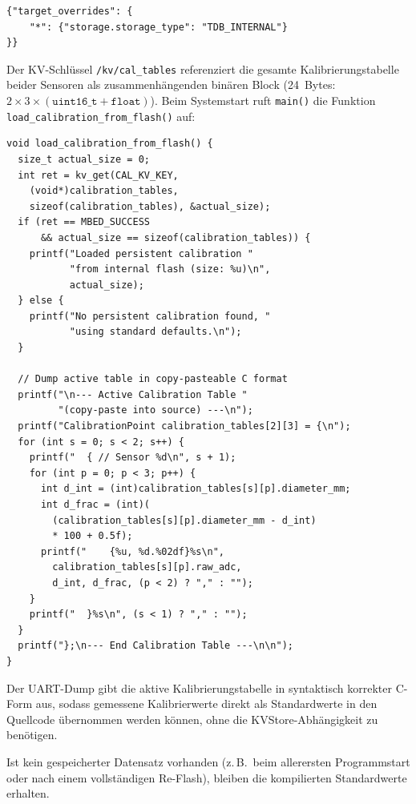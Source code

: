 \begin{lstlisting}[style=firmwarestyle, caption={KVStore-Konfiguration (\texttt{mbed\_app.json}).}, label={lst:sensor_kvstore_config}]
{"target_overrides": {
    "*": {"storage.storage_type": "TDB_INTERNAL"}
}}
\end{lstlisting}

Der KV-Schlüssel \texttt{/kv/cal\_tables} referenziert die gesamte Kalibrierungstabelle beider Sensoren als zusammenhängenden binären Block (\num{24}~Bytes: $2 \times 3 \times (\texttt{uint16\_t} + \texttt{float})$).
Beim Systemstart ruft \texttt{main()} die Funktion \texttt{load\_calibration\_from\_flash()} auf:

\begin{lstlisting}[style=firmwarestyle, caption={Laden der persistierten Kalibrierung beim Systemstart mit Dump-Ausgabe (\texttt{load\_calibration\_from\_flash}, Z.~128--155).}, label={lst:sensor_cal_load}]
void load_calibration_from_flash() {
  size_t actual_size = 0;
  int ret = kv_get(CAL_KV_KEY,
    (void*)calibration_tables,
    sizeof(calibration_tables), &actual_size);
  if (ret == MBED_SUCCESS
      && actual_size == sizeof(calibration_tables)) {
    printf("Loaded persistent calibration "
           "from internal flash (size: %u)\n",
           actual_size);
  } else {
    printf("No persistent calibration found, "
           "using standard defaults.\n");
  }

  // Dump active table in copy-pasteable C format
  printf("\n--- Active Calibration Table "
         "(copy-paste into source) ---\n");
  printf("CalibrationPoint calibration_tables[2][3] = {\n");
  for (int s = 0; s < 2; s++) {
    printf("  { // Sensor %d\n", s + 1);
    for (int p = 0; p < 3; p++) {
      int d_int = (int)calibration_tables[s][p].diameter_mm;
      int d_frac = (int)(
        (calibration_tables[s][p].diameter_mm - d_int)
        * 100 + 0.5f);
      printf("    {%u, %d.%02df}%s\n",
        calibration_tables[s][p].raw_adc,
        d_int, d_frac, (p < 2) ? "," : "");
    }
    printf("  }%s\n", (s < 1) ? "," : "");
  }
  printf("};\n--- End Calibration Table ---\n\n");
}
\end{lstlisting}

Der UART-Dump gibt die aktive Kalibrierungstabelle in syntaktisch korrekter C-Form aus, sodass gemessene Kalibrierwerte direkt als Standardwerte in den Quellcode übernommen werden können, ohne die KVStore-Abhängigkeit zu benötigen.

Ist kein gespeicherter Datensatz vorhanden (z.\,B.\ beim allerersten Programmstart oder nach einem vollständigen Re-Flash), bleiben die kompilierten Standardwerte erhalten.

